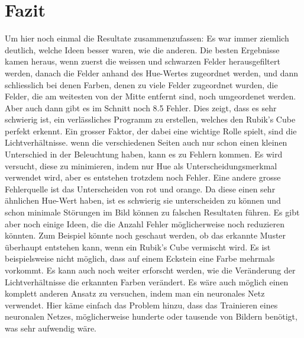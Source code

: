 \documentclass[a4paper, 12pt]{article}
\begin{document}
\section{Fazit}
Um hier noch einmal die Resultate zusammenzufassen: Es war immer ziemlich deutlich, welche Ideen besser waren, wie die anderen. Die besten Ergebnisse kamen heraus, wenn zuerst die weissen und schwarzen Felder herausgefiltert werden, danach die Felder anhand des Hue-Wertes zugeordnet werden, und dann schliesslich bei denen Farben, denen zu viele Felder zugeordnet wurden, die Felder, die am weitesten von der Mitte entfernt sind, noch umgeordenet werden. Aber auch dann gibt es im Schnitt noch 8.5 Fehler. Dies zeigt, dass es sehr schwierig ist, ein verlässliches Programm zu erstellen, welches den Rubik's Cube perfekt erkennt. Ein grosser Faktor, der dabei eine wichtige Rolle spielt, sind die Lichtverhältnisse. wenn die verschiedenen Seiten auch nur schon einen kleinen Unterschied in der Beleuchtung haben, kann es zu Fehlern kommen. Es wird versucht, diese zu minimieren, indem nur Hue als Unterscheidungsmerkmal verwendet wird, aber es entstehen trotzdem noch Fehler. Eine andere grosse Fehlerquelle ist das Unterscheiden von rot und orange. Da diese einen sehr ähnlichen Hue-Wert haben, ist es schwierig sie unterscheiden zu können und schon minimale Störungen im Bild können zu falschen Resultaten führen. Es gibt aber noch einige Ideen, die die Anzahl Fehler möglicherweise noch reduzieren könnten. Zum Beispiel könnte noch geschaut werden, ob das erkannte Muster überhaupt entstehen kann, wenn ein Rubik's Cube vermischt wird. Es ist beispielsweise nicht möglich, dass auf einem Eckstein eine Farbe mehrmals vorkommt. Es kann auch noch weiter erforscht werden, wie die Veränderung der Lichtverhältnisse die erkannten Farben verändert. Es wäre auch möglich einen komplett anderen Ansatz zu versuchen, indem man ein neuronales Netz verwendet. Hier käme einfach das Problem hinzu, dass das Trainieren eines neuronalen Netzes, möglicherweise hunderte oder tausende von Bildern benötigt, was sehr aufwendig wäre.
\newpage
\printbibliography[heading=bibnumbered]
\end{document}
